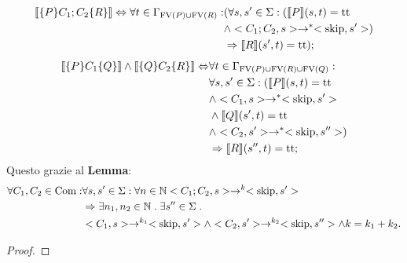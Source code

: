 \begin{align*}
   \llbracket \{P\} C_1;C_2\{R\} \rrbracket \Leftrightarrow \forall t \in \Gamma_{\mathrm{FV}(P)\cup\mathrm{FV}(R)}\mathrel{:}
      &(\forall s,s'\in \Sigma \mathrel{:}(\llbracket P \rrbracket(s,t) = \mathrm{tt}\\
      &\land <C_1;C_2,s>\rightarrow ^*<\mathrm{skip},s'>)\\
      &\Rightarrow\llbracket R \rrbracket(s',t)=\mathrm{tt});
\end{align*}
\begin{align*}
   \llbracket \{P\}C_1\{Q\} \rrbracket \land \llbracket \{Q\}C_2\{R\} \rrbracket \Leftrightarrow
      &\forall t \in \Gamma_{\mathrm{FV}(P)\cup\mathrm{FV}(R)\cup\mathrm{FV}(Q)}\mathrel{:}\\
      &\forall s,s'\in \Sigma \mathrel{:}(\llbracket P \rrbracket(s,t) = \mathrm{tt}\\
      &\land <C_1,s>\rightarrow ^*<\mathrm{skip},s'>\\
      &\land \llbracket Q\rrbracket(s',t)=\mathrm{tt} \\
      &\land <C_2,s'>\rightarrow ^*<\mathrm{skip},s''>)\\
      &\Rightarrow \llbracket R \rrbracket(s'',t)=\mathrm{tt};
\end{align*}
Questo grazie al \textbf{Lemma}:
\begin{align*}
   \forall C_1,C_2 \in \mathrm{Com} \mathrel{:} 
   &\forall s,s' \in \Sigma \mathrel{:} \forall n \in \mathbb{N} <C_1;C_2,s>\rightarrow ^k<\mathrm{skip},s'> \\
   &\Rightarrow \exists n_1,n_2 \in \mathbb{N} \mathrel{.} \exists s'' \in \Sigma \mathrel{.} \\
   &<C_1,s>\rightarrow ^{k_1}<\mathrm{skip},s'> \land <C_2,s'>\rightarrow ^{k_2}<\mathrm{skip},s''> \land k = k_1 + k_2.
\end{align*}
\begin{proof}

\end{proof}
